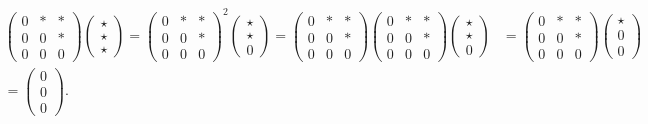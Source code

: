\begin{example}
\begin{enumerate}
\begin{align*}
\begin{pmatrix}
                0 & \ast &\ast\\
                0 & 0 & \ast\\
                0 & 0 & 0
            \end{pmatrix}\begin{pmatrix}
                \star\\
                \star\\
                \star
            \end{pmatrix} = \begin{pmatrix}
                0 & \ast &\ast\\
                0 & 0 & \ast\\
                0 & 0 & 0
            \end{pmatrix}^2 \begin{pmatrix}
                \star \\
                \star\\
                0
            \end{pmatrix}
            = \begin{pmatrix}
                0 & \ast &\ast\\
                0 & 0 & \ast\\
                0 & 0 & 0
            \end{pmatrix}\begin{pmatrix}
                0 & \ast &\ast\\
                0 & 0 & \ast\\
                0 & 0 & 0
            \end{pmatrix}\begin{pmatrix}
                \star \\
                \star\\
                0
            \end{pmatrix}
            &= \begin{pmatrix}
                0 & \ast &\ast\\
                0 & 0 & \ast\\
                0 & 0 & 0
            \end{pmatrix} \begin{pmatrix}
                \star\\
                0\\
                0
            \end{pmatrix}\\
            = \begin{pmatrix}
                0 \\
                0\\
                0
            \end{pmatrix}.
        \end{align*}
    \end{enumerate}
\end{example}


